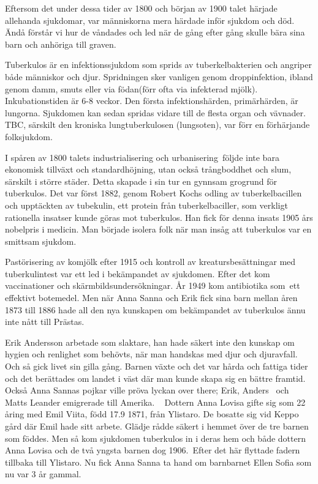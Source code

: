 Eftersom det under dessa tider av 1800 och början av 1900 talet härjade allehanda sjukdomar, var människorna mera härdade inför sjukdom och död. Ändå förstår vi hur de våndades och led när de gång efter gång skulle bära sina barn och anhöriga till graven.



Tuberkulos är en infektionssjukdom som sprids av tuberkelbakterien och angriper både människor och djur. Spridningen sker vanligen genom droppinfektion, ibland genom damm, smuts eller via födan(förr ofta via infekterad mjölk). Inkubationstiden är 6-8 veckor. Den första infektionshärden, primärhärden, är lungorna. Sjukdomen kan sedan spridas vidare till de flesta organ och vävnader. TBC, särskilt den kroniska lungtuberkulosen (lungsoten), var förr en förhärjande folksjukdom.

I spåren av 1800 talets industrialisering och urbanisering följde inte bara ekonomisk tillväxt och standardhöjning, utan också trångboddhet och slum, särskilt i större städer. Detta skapade i sin tur en gynnsam grogrund för tuberkulos. Det var först 1882, genom Robert Kochs odling av tuberkelbacillen och upptäckten av tubekulin, ett protein från tuberkelbaciller, som verkligt rationella insatser kunde göras mot tuberkulos. Han fick för denna insats 1905 års nobelpris i medicin. Man började isolera folk när man insåg att tuberkulos var en smittsam sjukdom.

Pastörisering av komjölk efter 1915 och kontroll av kreatursbesättningar med tuberkulintest var ett led i bekämpandet av sjukdomen. Efter det kom vaccinationer och skärmbildsundersökningar. År 1949 kom antibiotika som ett effektivt botemedel. Men när Anna Sanna och Erik fick sina barn mellan åren 1873 till 1886 hade all den nya kunskapen om bekämpandet av tuberkulos ännu inte nått till Prästas.

Erik Andersson arbetade som slaktare, han hade säkert inte den kunskap om hygien och renlighet som behövts, när man handskas med djur och djuravfall. Och så gick livet sin gilla gång. Barnen växte och det var hårda och fattiga tider och det berättades om landet i väst där man kunde skapa sig en bättre framtid. Också Anna Sannas pojkar ville pröva lyckan over there; Erik, Anders  och Matts Leander emigrerade till Amerika.
  
Dottern Anna Lovisa gifte sig som 22 åring med Emil Viita, född 17.9 1871, från Ylistaro. De bosatte sig vid Keppo gård där Emil hade sitt arbete. Glädje rådde säkert i hemmet över de tre barnen som föddes. Men så kom sjukdomen tuberkulos in i deras hem och både dottern Anna Lovisa och de två yngsta barnen dog 1906. Efter det här flyttade fadern tillbaka till Ylistaro. Nu fick Anna Sanna ta hand om barnbarnet Ellen Sofia som nu var 3 år gammal.

